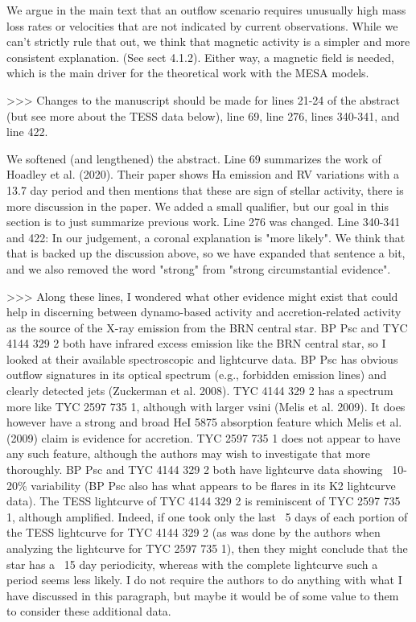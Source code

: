 We argue in the main text that an outflow scenario requires unusually high mass loss rates or velocities that are not indicated by current observations. While we can't strictly rule that out, we think that magnetic activity is a simpler and more consistent explanation. (See sect 4.1.2). Either way, a magnetic field is needed, which is the main driver for the theoretical work with the MESA models.

>>> Changes to the manuscript should be made for lines 21-24 of the abstract (but see more about the TESS data below), line 69, line 276, lines 340-341, and line 422.

We softened (and lengthened) the abstract. Line 69  summarizes the work of Hoadley et al. (2020). Their paper shows Ha emission and RV variations with a 13.7 day period and then mentions that these are sign of stellar activity, there is more discussion in the paper. We added a small qualifier, but our goal in this section is to just summarize previous work. Line 276 was changed.
Line 340-341 and 422: In our judgement, a coronal explanation is "more likely". We think that that is backed up the discussion above, so we have expanded that sentence a bit, and we also removed the word "strong" from "strong circumstantial evidence". 

>>> Along these lines, I wondered what other evidence might exist that could help in discerning between dynamo-based activity and accretion-related activity as the source of the X-ray emission from the BRN central star. BP Psc and TYC 4144 329 2 both have infrared excess emission like the BRN central star, so I looked at their available spectroscopic and lightcurve data. BP Psc has obvious outflow signatures in its optical spectrum (e.g., forbidden emission lines) and clearly detected jets (Zuckerman et al. 2008). TYC 4144 329 2 has a spectrum more like TYC 2597 735 1, although with larger vsini (Melis et al. 2009). It does however have a strong and broad HeI 5875 absorption feature which Melis et al. (2009) claim is evidence for accretion. TYC 2597 735 1 does not appear to have any such feature, although the authors may wish to investigate that more thoroughly. BP Psc and TYC 4144 329 2 both have lightcurve data showing ~10-20\% variability (BP Psc also has what appears to be flares in its K2 lightcurve data). The TESS lightcurve of TYC 4144 329 2 is reminiscent of TYC 2597 735 1, although amplified. Indeed, if one took only the last ~5 days of each portion of the TESS lightcurve for TYC 4144 329 2 (as was done by the authors when analyzing the lightcurve for TYC 2597 735 1), then they might conclude that the star has a ~15 day periodicity, whereas with the complete lightcurve such a period seems less likely. I do not require the authors to do anything with what I have discussed in this paragraph, but maybe it would be of some value to them to consider these additional data.

